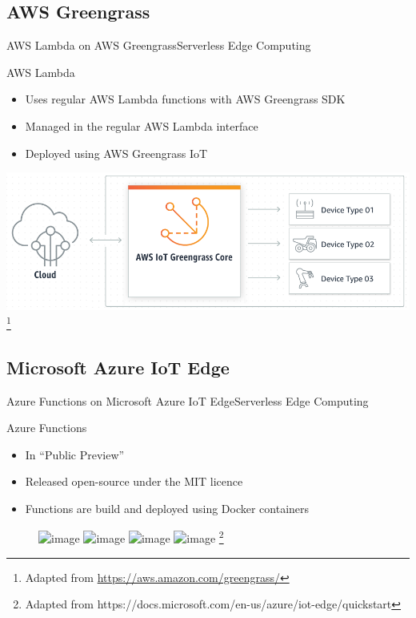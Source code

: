 \documentclass[10pt,xcolor={dvipsnames}]{beamer}
\renewcommand{\logofile}{example-grid-100x100pt}
\renewcommand{\logoscale}{0.0}
\begin{document}
\subsection{AWS Greengrass}
\renewcommand{\logofile}{img/aws_lambda}
\renewcommand{\logoscale}{0.55}
\begin{frame}{AWS Lambda on AWS Greengrass}{Serverless Edge Computing}

\begin{block}{AWS Lambda}
\begin{itemize}
    \item Uses regular AWS Lambda functions with AWS Greengrass SDK
    \item Managed in the regular AWS Lambda interface
    \item Deployed using AWS Greengrass IoT
\end{itemize}
\end{block}
\includegraphics[width=\textwidth]{img/aws_ggc_working}\footnote{Adapted from \href{https://aws.amazon.com/greengrass/}{https://aws.amazon.com/greengrass/}}
\end{frame}

\subsection{Microsoft Azure IoT Edge}
\renewcommand{\logofile}{img/azure_functions}
\renewcommand{\logoscale}{0.7}
\begin{frame}{Azure Functions on Microsoft Azure IoT Edge}{Serverless Edge Computing}

\begin{block}{Azure Functions}
\begin{itemize}
    \item In ``Public Preview''
    \item Released open-source under the MIT licence
    \item Functions are build and deployed using Docker containers
\end{itemize}
\end{block}
\begin{figure}
    \includegraphics<2>[width=.65\textwidth]{img/install-edge-1}
    \includegraphics<3>[width=.65\textwidth]{img/install-edge-2}
    \includegraphics<4>[width=.65\textwidth]{img/install-edge-3}
    \includegraphics<5>[width=.65\textwidth]{img/install-edge-4}
    \footnote<2-5>{Adapted from https://docs.microsoft.com/en-us/azure/iot-edge/quickstart}
\end{figure}
\end{frame}
\end{document}
